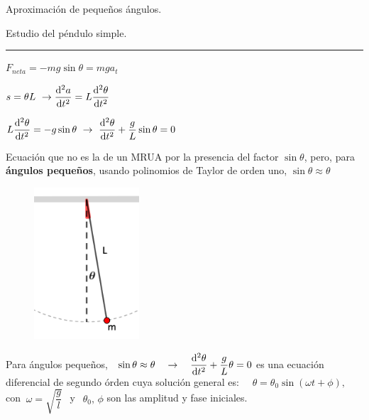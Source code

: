 \vspace{1cm}
\begin{miejercicio}

\color{gris}
\begin{multicols}{2}
Aproximación de pequeños ángulos.

\vspace{3mm}Estudio del péndulo simple.


\color{teal!80}
\rule{200pt}{0.2pt}
\color{gris}
\vspace{5mm}

$F_{neta}=-mg\sin \theta =mga_t$

\vspace{3mm}$s=\theta L \ \to \displaystyle \dv[2]{a}{t}=L\dv[2]{\theta}{t}$

\vspace{3mm} $\displaystyle L \dv[2]{\theta}{t}=-g\sin \theta \ \to \ \dv[2]{\theta}{t}+\dfrac g L\sin \theta=0$

\vspace{3mm} Ecuación que no es la de un MRUA por la presencia del factor $\sin \theta$, pero, para \textbf{ángulos pequeños}, usando polinomios de Taylor de orden uno, $\sin \theta \approx \theta$


\begin{figure}[H]
	\centering
	\includegraphics[width=0.35\textwidth]{imagenes/T02IM07.png}
	\end{figure}
\end{multicols}	


Para ángulos pequeños, $\ \ \displaystyle \sin \theta \approx \theta \quad \to \quad \dv[2]{\theta}{t}+\dfrac g L \theta=0$ es una ecuación diferencial de segundo órden cuya solución general es:
$\quad \theta = \theta_0 \sin(\omega t+\phi),\quad $ con $\  \omega=\sqrt{\dfrac{g}{l}}\ \ $ y $\  \ \theta_0,\, \phi $ son las amplitud y fase iniciales. 
\end{miejercicio}

